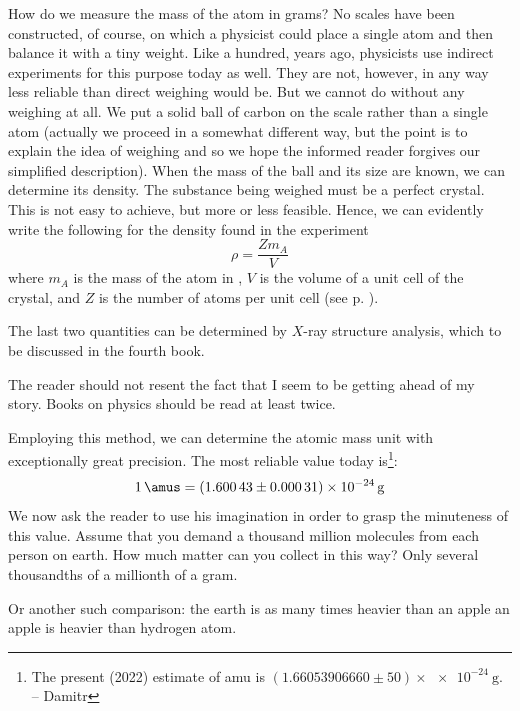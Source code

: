 How do we measure the mass of the atom in grams? No scales have been constructed, of course, on which a physicist could place a single atom and then balance it with a tiny weight. Like a hundred, years ago, physi­cists use indirect experiments for this purpose today as well. They are not, however, in any way less reliable than direct weighing would be. But we cannot do without any weighing at all. We put a solid ball of carbon  on the scale rather than a single atom (actually we proceed in a somewhat different way, but the point is to explain the idea of weighing and so we hope the informed reader forgives our simplified description). When the mass of the ball and its size are known, we can determine its density. The substance being weighed must be a perfect crystal. This is not easy to achieve, but more or less feasible. Hence, we can evidently write the fol­lowing for the density found in the experiment
\begin{equation*}%
\rho = \frac{Z m_{A} }{V}
\end{equation*}
where $m_{A}$ is the mass of the atom in \si{\amus}, $V$ is the volume of a unit cell of the crystal, and $Z$ is the number of atoms per unit cell (see p. \pageref{unit-cell-def}). 

The last two quantities can be determined by $X$-ray structure analysis, which to be discussed in the fourth book.

The reader should not resent the fact that I seem to be getting ahead of my story. Books on physics should be read at least twice.

Employing this method, we can determine the atomic mass unit with exceptionally great precision. The most reliable value today is\footnote{The present (2022) estimate of amu is $(\num{1.66053906660} \pm \num{50})\times \SI{e-24}{\gram}$. -- Damitr}:
\begin{equation*}%
\SI{1}{\amus} = (\num{1.60043} \pm \num{0.00031})\times \SI{e-24}{\gram}
\end{equation*}
We now ask the reader to use his imagination in order to grasp the minuteness of this value. Assume that you demand a thousand million molecules from each person on earth. How much matter can you collect in this way? Only several thousandths of a millionth of a gram.

Or another such comparison: the earth is as many times heavier than an apple an apple is heavier than hydrogen atom.

